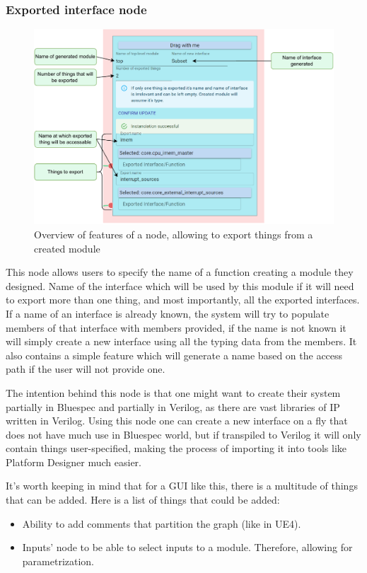 \documentclass[12pt]{report}
\begin{document}
\subsubsection{Exported interface node}
\begin{figure}[h!]
\centering

\includegraphics[width=0.8\columnwidth]{pdfExports/LargeMap-ExportNode.drawio.pdf}
\caption{Overview of features of a node, allowing to export things from a created module}
\end{figure}
This node allows users to specify the name of a function creating a module they designed. Name of the interface which will be used by this module if it will need to export more than one thing, and most importantly, all the exported interfaces. If a name of an interface is already known, the system will try to populate members of that interface with members provided, if the name is not known it will simply create a new interface using all the typing data from the members. It also contains a simple feature which will generate a name based on the access path if the user will not provide one. 
\par
The intention behind this node is that one might want to create their system partially in Bluespec and partially in Verilog, as there are vast libraries of IP written in Verilog. Using this node one can create a new interface on a fly that does not have much use in Bluespec world, but if transpiled to Verilog it will only contain things user-specified, making the process of importing it into tools like Platform Designer much easier. 
\begin{tcolorbox}[title=Futher work (TODO this can be removed)]It's worth keeping in mind that for a GUI like this, there is a multitude of things that can be added. Here is a list of things that could be added: 
\begin{itemize}
\item Ability to add comments that partition the graph (like in UE4).
\item Inputs' node to be able to select inputs to a module. Therefore, allowing for parametrization.
\end{itemize}
\end{tcolorbox}
\end{document}
